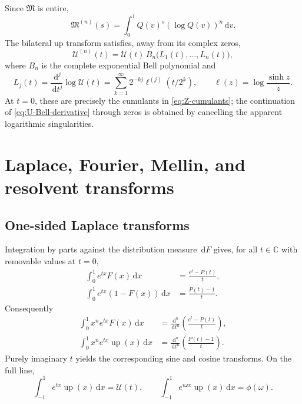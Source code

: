 \documentclass[11pt,oneside]{article}
\theoremstyle{definition}
\newcommand{\F}{F}
\newcommand{\Q}{Q}
\newcommand{\upf}{\operatorname{up}}
\newcommand{\M}{\mathfrak M}
\newcommand{\C}{\mathbb C}
\newcommand{\dd}{\,\mathrm d}
\begin{document}
Since \(\M\) is entire,
\begin{equation}\label{eq:M-nth-derivative}
 \M^{(n)}(s)=\int_0^1\Q(v)^s(\log\Q(v))^n\dd v.
\end{equation}
The bilateral up transform satisfies, away from its complex zeros,
\begin{equation}\label{eq:U-Bell-derivative}
 \mathcal U^{(n)}(t)
 =\mathcal U(t)\,
 B_n\bigl(L_1(t),\ldots,L_n(t)\bigr),
\end{equation}
where \(B_n\) is the complete exponential Bell polynomial and
\begin{equation}\label{eq:Lj-def}
 L_j(t)=\frac{\dd^j}{\dd t^j}\log\mathcal U(t)
 =\sum_{k=1}^{\infty}2^{-kj}
 \ell^{(j)}(t/2^k),
 \qquad \ell(z)=\log\frac{\sinh z}{z}.
\end{equation}
At \(t=0\), these are precisely the cumulants in \cref{eq:Z-cumulants}; the
continuation of \cref{eq:U-Bell-derivative} through zeros is obtained by cancelling the
apparent logarithmic singularities.

\section{Laplace, Fourier, Mellin, and resolvent transforms}

\subsection{One-sided Laplace transforms}

Integration by parts against the distribution measure \(\dd\F\) gives, for all
\(t\in\C\) with removable values at \(t=0\),
\begin{align}
 \int_0^1e^{tx}\F(x)\dd x
 &=\frac{e^t-P(t)}t,
 \label{eq:Laplace-F}\\
 \int_0^1e^{tx}(1-\F(x))\dd x
 &=\frac{P(t)-1}t.
 \label{eq:Laplace-up-half}
\end{align}
Consequently
\begin{align}
 \int_0^1x^ne^{tx}\F(x)\dd x
 &=\frac{\dd^n}{\dd t^n}\left(\frac{e^t-P(t)}t\right),
 \label{eq:exp-poly-F}\\
 \int_0^1x^ne^{tx}\upf(x)\dd x
 &=\frac{\dd^n}{\dd t^n}\left(\frac{P(t)-1}t\right).
 \label{eq:exp-poly-up}
\end{align}
Purely imaginary \(t\) yields the corresponding sine and cosine transforms.  On the
full line,
\begin{equation}\label{eq:bilateral-up-transform}
 \int_{-1}^1e^{tx}\upf(x)\dd x=\mathcal U(t),
 \qquad
 \int_{-1}^1e^{i\omega x}\upf(x)\dd x=\phi(\omega).
\end{equation}
\end{document}
